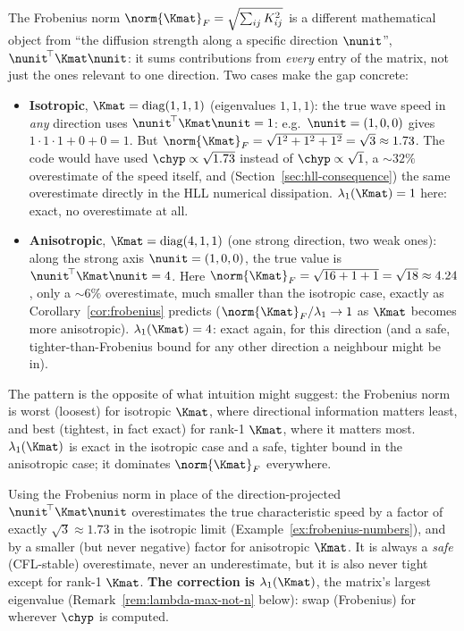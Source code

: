 \begin{example}
\label{ex:frobenius-numbers}
The Frobenius norm $\norm{\Kmat}_F=\sqrt{\sum_{ij}K_{ij}^2}$ is a
different mathematical object from ``the diffusion strength along a
specific direction $\nunit$'', $\nunit^{\!\top}\Kmat\nunit$: it sums
contributions from \emph{every} entry of the matrix, not just the ones
relevant to one direction. Two cases make the gap concrete:
\begin{itemize}
\item \textbf{Isotropic}, $\Kmat=\mathrm{diag}(1,1,1)$ (eigenvalues
  $1,1,1$): the true wave speed in \emph{any} direction uses
  $\nunit^{\!\top}\Kmat\nunit=1$: e.g.\ $\nunit=(1,0,0)$ gives
  $1\cdot1\cdot1+0+0=1$. But $\norm{\Kmat}_F=\sqrt{1^2+1^2+1^2}=\sqrt3\approx1.73$.
  The code would have used $\chyp\propto\sqrt{1.73}$ instead of
  $\chyp\propto\sqrt1$, a $\sim32\%$ overestimate of the speed itself,
  and (Section~\ref{sec:hll-consequence}) the same overestimate directly
  in the HLL numerical dissipation. $\lambda_1(\Kmat)=1$ here: exact, no
  overestimate at all.
\item \textbf{Anisotropic}, $\Kmat=\mathrm{diag}(4,1,1)$ (one strong
  direction, two weak ones): along the strong axis $\nunit=(1,0,0)$, the
  true value is $\nunit^{\!\top}\Kmat\nunit=4$. Here
  $\norm{\Kmat}_F=\sqrt{16+1+1}=\sqrt{18}\approx4.24$, only a
  $\sim6\%$ overestimate, much smaller than the isotropic case, exactly
  as Corollary~\ref{cor:frobenius} predicts ($\norm{\Kmat}_F/\lambda_1\to1$
  as $\Kmat$ becomes more anisotropic). $\lambda_1(\Kmat)=4$: exact again,
  for this direction (and a safe, tighter-than-Frobenius bound for any
  other direction a neighbour might be in).
\end{itemize}
The pattern is the opposite of what intuition might suggest: the
Frobenius norm is worst (loosest) for isotropic $\Kmat$, where directional
information matters least, and best (tightest, in fact exact) for
rank-1 $\Kmat$, where it matters most. $\lambda_1(\Kmat)$ is exact in the
isotropic case and a safe, tighter bound in the anisotropic case; it
dominates $\norm{\Kmat}_F$ everywhere.
\end{example}
Using the Frobenius norm in place of the direction-projected
$\nunit^{\!\top}\Kmat\nunit$ overestimates the true characteristic speed
by a factor of exactly $\sqrt3\approx1.73$ in the isotropic limit
(Example~\ref{ex:frobenius-numbers}), and by a smaller (but never
negative) factor for anisotropic $\Kmat$. It is always a \emph{safe}
(CFL-stable) overestimate, never an underestimate, but it is also never
tight except for rank-1 $\Kmat$. \textbf{The correction is
$\lambda_1(\Kmat)$}, the matrix's largest eigenvalue (Remark~\ref{rem:lambda-max-not-n}
below): swap  (Frobenius) for
 wherever $\chyp$ is
computed.

